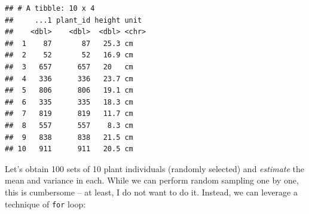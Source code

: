 \documentclass[
]{book}
\newenvironment{Shaded}{\begin{snugshade}}{\end{snugshade}}
\newcommand{\AttributeTok}[1]{\textcolor[rgb]{0.77,0.63,0.00}{#1}}
\newcommand{\CommentTok}[1]{\textcolor[rgb]{0.56,0.35,0.01}{\textit{#1}}}
\newcommand{\ConstantTok}[1]{\textcolor[rgb]{0.00,0.00,0.00}{#1}}
\newcommand{\ControlFlowTok}[1]{\textcolor[rgb]{0.13,0.29,0.53}{\textbf{#1}}}
\newcommand{\DecValTok}[1]{\textcolor[rgb]{0.00,0.00,0.81}{#1}}
\newcommand{\FunctionTok}[1]{\textcolor[rgb]{0.00,0.00,0.00}{#1}}
\newcommand{\NormalTok}[1]{#1}
\newcommand{\OtherTok}[1]{\textcolor[rgb]{0.56,0.35,0.01}{#1}}
\newcommand{\SpecialCharTok}[1]{\textcolor[rgb]{0.00,0.00,0.00}{#1}}
\begin{document}
\begin{verbatim}
## # A tibble: 10 x 4
##     ...1 plant_id height unit 
##    <dbl>    <dbl>  <dbl> <chr>
##  1    87       87   25.3 cm   
##  2    52       52   16.9 cm   
##  3   657      657   20   cm   
##  4   336      336   23.7 cm   
##  5   806      806   19.1 cm   
##  6   335      335   18.3 cm   
##  7   819      819   11.7 cm   
##  8   557      557    8.3 cm   
##  9   838      838   21.5 cm   
## 10   911      911   20.5 cm
\end{verbatim}

Let's obtain 100 sets of 10 plant individuals (randomly selected) and \emph{estimate} the mean and variance in each. While we can perform random sampling one by one, this is cumbersome -- at least, I do not want to do it. Instead, we can leverage a technique of \texttt{for} loop:

\begin{Shaded}
\end{Shaded}
\end{document}
